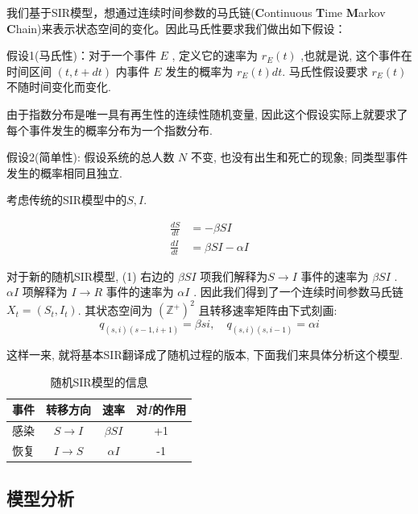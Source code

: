 \documentclass[UTF8]{ctexart}
\begin{document}
			我们基于SIR模型，想通过连续时间参数的马氏链(\textbf{C}ontinuous
			\textbf{T}ime \textbf{M}arkov
			\textbf{C}hain)来表示状态空间的变化。因此马氏性要求我们做出如下假设：
			
			假设1(马氏性)：对于一个事件 \(E\) , 定义它的速率为 \( r_E(t)\)
			,也就是说, 这个事件在时间区间 \((t, t+dt)\) 内事件 \(E\) 发生的概率为
			\(r_E(t)dt\). 马氏性假设要求 \(r_E(t)\) 不随时间变化而变化.
			
			由于指数分布是唯一具有再生性的连续性随机变量,
			因此这个假设实际上就要求了每个事件发生的概率分布为一个指数分布.
			
			假设2(简单性): 假设系统的总人数 \(N\) 不变, 也没有出生和死亡的现象;
			同类型事件发生的概率相同且独立.
			
			考虑传统的SIR模型中的$S,I$.
			
			\begin{equation}
			\begin{aligned}
			\frac{dS}{dt} &= -\beta SI \\
			\frac{dI}{dt} &= \beta SI-\alpha I
			\end{aligned} 
			\end{equation}
			
			对于新的随机SIR模型, (1) 右边的 \(\beta SI\) 项我们解释为\(S \to I\)
			事件的速率为 \(\beta SI\) . \( \alpha I\) 项解释为 \(I \to R \)
			事件的速率为 \(\alpha I \) . 因此我们得到了一个连续时间参数马氏链
			\(X_t =(S_t,I_t)\). 其状态空间为 \((\mathbb{Z}^{+})^2\)
			且转移速率矩阵由下式刻画:
			\begin{equation}
			q_{(s,i)(s-1,i+1)}=\beta s i, \quad q_{(s,i)(s,i-1)}=\alpha i
			\end{equation}
			
			这样一来, 就将基本SIR翻译成了随机过程的版本, 下面我们来具体分析这个模型.
			\begin{table}[H]
				\centering
				\begin{tabular}{c|c|c|c}
					事件 & 转移方向 & 速率 & 对\(I\)的作用\\ \hline
					感染 & \(S \to I\) & \(\beta SI\) & +1\\
					恢复 & \(I \to S\) & \(\alpha I\) & -1
				\end{tabular}
				\caption{随机SIR模型的信息}
				\label{tab:my_label}
			\end{table}
		
		
		\subsection{模型分析}
			
\end{document}
